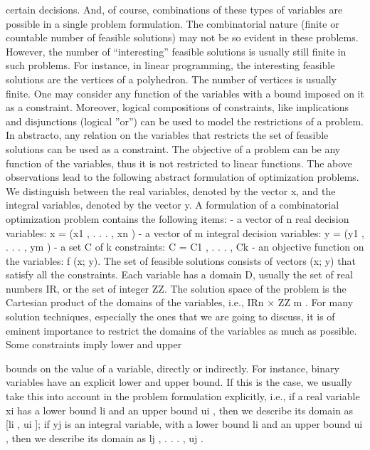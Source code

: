 \documentclass[titlepage]{book}
\begin{document}
certain decisions. And, of course, combinations of these types of variables are possible in a single problem
formulation. The combinatorial nature (finite or countable number of feasible solutions) may not be so
evident in these problems. However, the number of “interesting” feasible solutions is usually still finite
in such problems. For instance, in linear programming, the interesting feasible solutions are the vertices
of a polyhedron. The number of vertices is usually finite.
One may consider any function of the variables with a bound imposed on it as a constraint. Moreover,
logical compositions of constraints, like implications and disjunctions (logical ”or”) can be used to model
the restrictions of a problem. In abstracto, any relation on the variables that restricts the set of feasible
solutions can be used as a constraint.
The objective of a problem can be any function of the variables, thus it is not restricted to linear functions.
The above observations lead to the following abstract formulation of optimization problems. We distinguish between the real variables, denoted by the vector x, and the integral variables, denoted by the
vector y. A formulation of a combinatorial optimization problem contains the following items:
- a vector of n real decision variables:
x = (x1 , . . . , xn )
- a vector of m integral decision variables:
y = (y1 , . . . , ym )
- a set C of k constraints:
C = {C1 , . . . , Ck }
- an objective function on the variables:
f (x; y).
The set of feasible solutions consists of vectors (x; y) that satisfy all the constraints. Each variable has a
domain D, usually the set of real numbers IR, or the set of integer ZZ. The solution space of the problem
is the Cartesian product of the domains of the variables, i.e., IRn × ZZ m .
For many solution techniques, especially the ones that we are going to discuss, it is of eminent importance
to restrict the domains of the variables as much as possible. Some constraints imply lower and upper

bounds on the value of a variable, directly or indirectly. For instance, binary variables have an explicit
lower and upper bound. If this is the case, we usually take this into account in the problem formulation
explicitly, i.e., if a real variable xi has a lower bound li and an upper bound ui , then we describe its
domain as [li , ui ]; if yj is an integral variable, with a lower bound li and an upper bound ui , then we
describe its domain as {lj , . . . , uj }.
\end{document}
